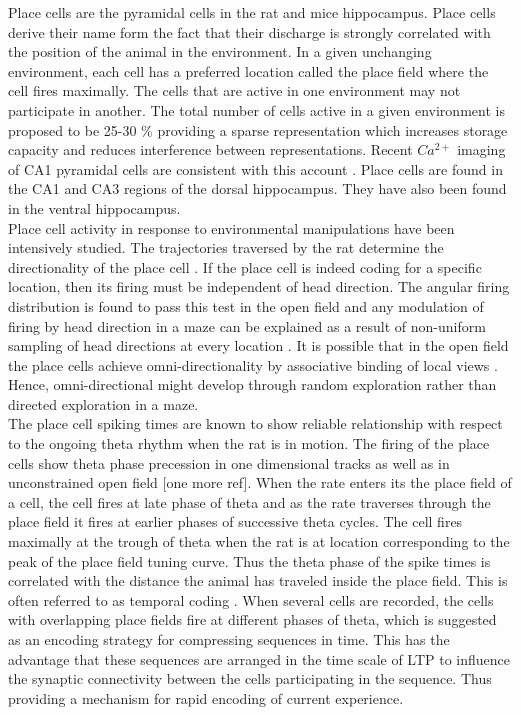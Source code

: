 Place cells are the  pyramidal cells in the rat and mice hippocampus. Place cells derive their name form the fact that their discharge is strongly correlated with the position of the animal in the environment. In a given unchanging environment, each cell has a preferred location called the place field where the cell fires maximally.  The cells that are active in one environment may not participate in another. The total number of cells active in a given environment is proposed to be 25-30 \% providing a sparse representation which increases storage capacity and reduces interference between representations\cite{Marr2007, Wilson1993}. Recent $Ca^{2+}$ imaging of CA1 pyramidal cells are consistent with this account \cite{Ziv2013}.
Place cells are found in the CA1 and CA3 regions of the dorsal hippocampus. They have also been found in the ventral hippocampus.\\
Place cell activity in response to environmental manipulations have been intensively studied. The trajectories traversed by the rat determine the directionality of the place cell \cite{Save1998}. If the place cell is indeed coding for a specific location, then its firing must be independent of  head direction. The angular firing distribution is found to pass this test in the open field and any modulation of firing by head direction in a maze can be explained as a result of non-uniform sampling of head directions at every location \cite{Muller1994}. It is possible that in the open field the place cells achieve omni-directionality by associative binding of local views \cite{Sharp1991}. Hence, omni-directional might develop through random exploration rather than directed exploration in a maze.\\
The place cell spiking times are known to show reliable relationship with respect to the ongoing theta rhythm when the rat is in motion. The firing of the place cells show theta phase precession in one dimensional tracks \cite{O'Keefe1993} as well as in unconstrained open field \cite{Skaggs1996c} [one more ref]. When the rate enters its the place field of a cell, the cell fires at late phase of theta and as the rate traverses through the place field it fires at earlier phases of successive theta cycles. The cell fires maximally at the trough of theta when the rat is at location corresponding to the peak of the place field tuning curve. Thus the theta phase of the spike times is correlated with the distance the animal has traveled inside the place field. This is often referred to as temporal coding \cite{Huxter2003}. When several cells are recorded, the cells with overlapping place fields fire at different phases of theta, which is suggested as an encoding strategy for compressing sequences in time. This has the advantage that these sequences are arranged in the time scale of LTP to influence the synaptic connectivity between the cells participating in the sequence. Thus providing a mechanism for rapid encoding of current experience. \\
